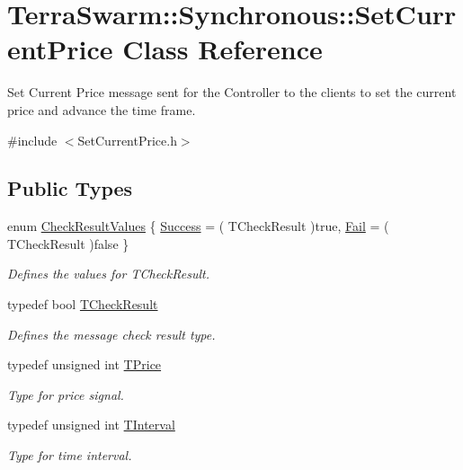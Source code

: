 \hypertarget{class_terra_swarm_1_1_synchronous_1_1_set_current_price}{\section{Terra\-Swarm\-:\-:Synchronous\-:\-:Set\-Current\-Price Class Reference}
\label{class_terra_swarm_1_1_synchronous_1_1_set_current_price}
}


Set Current Price message sent for the Controller to the clients to set the current price and advance the time frame.  




{\ttfamily \#include $<$Set\-Current\-Price.\-h$>$}

\subsection*{Public Types}
\begin{DoxyCompactItemize}
\item 
enum \hyperlink{class_terra_swarm_1_1_synchronous_1_1_set_current_price_a0234ba20aa9372d9aaee3948bd008909}{Check\-Result\-Values} \{ \hyperlink{class_terra_swarm_1_1_synchronous_1_1_set_current_price_a0234ba20aa9372d9aaee3948bd008909a15e21f3992df9723770d59fa064c3827}{Success} = ( T\-Check\-Result )true, 
\hyperlink{class_terra_swarm_1_1_synchronous_1_1_set_current_price_a0234ba20aa9372d9aaee3948bd008909a67c062540d8320b92b10a0f371dbc32b}{Fail} = ( T\-Check\-Result )false
 \}
\begin{DoxyCompactList}\small\item\em Defines the values for T\-Check\-Result. \end{DoxyCompactList}\item 
typedef bool \hyperlink{class_terra_swarm_1_1_synchronous_1_1_set_current_price_aeed4ef4c867719626ede15e2f8718436}{T\-Check\-Result}
\begin{DoxyCompactList}\small\item\em Defines the message check result type. \end{DoxyCompactList}\item 
typedef unsigned int \hyperlink{class_terra_swarm_1_1_synchronous_1_1_set_current_price_a2ed14f2a90070d19a70183bb63e7708e}{T\-Price}
\begin{DoxyCompactList}\small\item\em Type for price signal. \end{DoxyCompactList}\item 
typedef unsigned int \hyperlink{class_terra_swarm_1_1_synchronous_1_1_set_current_price_aa87902078a0788d13ef70b899d83f4d3}{T\-Interval}
\begin{DoxyCompactList}\small\item\em Type for time interval. \end{DoxyCompactList}\end{DoxyCompactItemize}
